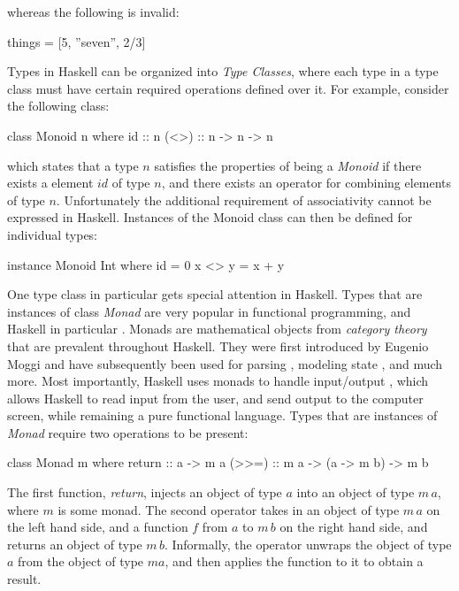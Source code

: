 \documentclass[thesis.tex]{subfiles}
\begin{document}
whereas the following is invalid:

\begin{spec}
things = [5, ''seven'', 2/3]
\end{spec}

Types in Haskell can be organized into \emph{Type Classes}, where each type in a
type class must have certain required operations defined over it. For example, consider
the following class:

\begin{spec}
class Monoid n where
    id  :: n
    (<>) :: n -> n -> n
\end{spec}

which states that a type $n$ satisfies the properties of being a \emph{Monoid} if there exists
a element $id$ of type $n$, and there exists an operator for combining elements of type $n$.
Unfortunately the additional requirement of associativity cannot be expressed in Haskell.
Instances of the Monoid class can then be defined for individual types:

\begin{spec}
instance Monoid Int where
    id = 0
    x <> y = x + y
\end{spec}

One type class in particular gets special attention in Haskell. Types that are instances of
class \emph{Monad} are very popular in functional programming, and Haskell in particular \cite{peyton1993imperative}. Monads
are mathematical objects from \emph{category theory} that are prevalent throughout Haskell.
They were first introduced by Eugenio Moggi \cite{moggi1991notions} and have subsequently been
used for parsing \cite{hutton1998monadic, leijen2001parsec, hafiz2010lazy}, modeling state
\cite{launchbury1994lazy}, and much more. Most
importantly, Haskell uses monads to handle input/output \cite{peyton1993imperative}, which allows Haskell to read
input from the user, and send output to the computer screen, while remaining a pure functional
language. Types that are instances of \emph{Monad} require two operations to be present:

\begin{spec}
class Monad m where
    return :: a -> m a
    (>>=)  :: m a -> (a -> m b) -> m b
\end{spec}

The first function, \emph{return}, injects an object of type $a$ into an object of type $m\,a$, where
$m$ is some monad. The second operator takes in an object of type $m\,a$ on the left hand side, and
a function $f$ from $a$ to $m\,b$ on the right hand side, and returns an object of type $m\,b$.
Informally, the operator unwraps the object of type $a$ from the object of type $m a$, and then applies
the function to it to obtain a result.
\end{document}
